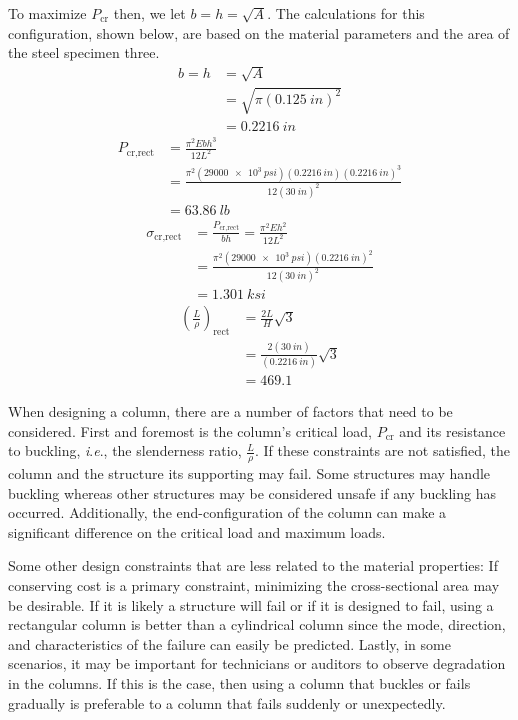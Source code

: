 \documentclass[12 pt]{article}
\newcommand{\ie}{\textit{i}.\textit{e}., }
\begin{document}
To maximize $P_\text{cr}$ then, we let $b=h=\sqrt{A}$. The calculations for this configuration, shown below, are based on the material parameters and the area of the steel specimen three.
\begin{align*}
	b=h&=\sqrt{A}\\
	&=\sqrt{\pi(\qty{0.125}{in})^2}\\
	&=\qty{0.2216}{in}
\end{align*}
\begin{align*}
	P_\text{cr,rect}&=\frac{\pi^2Ebh^3}{12L^2}\\
	&=\frac{\pi^2(\qty{29000e3}{psi})(\qty{0.2216}{in})(\qty{0.2216}{in})^3}{12(\qty{30}{in})^2}\\
	&=\qty{63.86}{lb}
\end{align*}
\begin{align*}
	\sigma_\text{cr,rect}&=\frac{P_\text{cr,rect}}{bh}=\frac{\pi^2Eh^2}{12L^2}\\
	&=\frac{\pi^2(\qty{29000e3}{psi})(\qty{0.2216}{in})^2}{12(\qty{30}{in})^2}\\
	&=\qty{1.301}{ksi}
\end{align*}
\begin{align*}
	\left(\frac{L}{\rho}\right)_\text{rect}&=\frac{2L}{H}\sqrt{3}\\
	&=\frac{2(\qty{30}{in})}{(\qty{0.2216}{in})}\sqrt{3}\\
	&=\num{469.1}
\end{align*}

When designing a column, there are a number of factors that need to be considered. First and foremost is the column's critical load, $P_\text{cr}$ and its resistance to buckling, \ie the slenderness ratio, $\frac{L}{\rho}$. If these constraints are not satisfied, the column and the structure its supporting may fail. Some structures may handle buckling whereas other structures may be considered unsafe if any buckling has occurred. Additionally, the end-configuration of the column can make a significant difference on the critical load and maximum loads.

Some other design constraints that are less related to the material properties: If conserving cost is a primary constraint, minimizing the cross-sectional area may be desirable. If it is likely a structure will fail or if it is designed to fail, using a rectangular column is better than a cylindrical column since the mode, direction, and characteristics of the failure can easily be predicted. Lastly, in some scenarios, it may be important for technicians or auditors to observe degradation in the columns. If this is the case, then using a column that buckles or fails gradually is preferable to a column that fails suddenly or unexpectedly.
\end{document}
